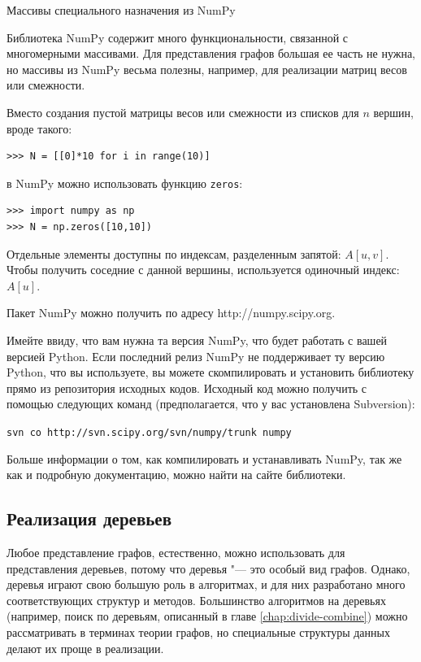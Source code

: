 \begin{notice}{Массивы специального назначения из NumPy}

Библиотека NumPy содержит много функциональности, связанной с многомерными массивами. Для представления графов большая ее часть не нужна, но массивы из NumPy весьма полезны, например, для реализации матриц весов или смежности.

Вместо создания пустой матрицы весов или смежности из списков для $n$ вершин, вроде такого:
\begin{lstlisting}
>>> N = [[0]*10 for i in range(10)]
\end{lstlisting}
в NumPy можно использовать функцию \texttt{zeros}:
\begin{lstlisting}
>>> import numpy as np
>>> N = np.zeros([10,10])
\end{lstlisting}

Отдельные элементы доступны по индексам, разделенным запятой: $A[u,v]$. Чтобы получить соседние с данной вершины, используется одиночный индекс: $A[u]$.

Пакет NumPy можно получить по адресу http://numpy.scipy.org.

Имейте ввиду, что вам нужна та версия NumPy, что будет работать с вашей версией Python. Если последний релиз NumPy не поддерживает ту версию Python, что вы используете, вы можете скомпилировать и установить библиотеку прямо из репозитория исходных кодов. Исходный код можно получить с помощью следующих команд (предполагается, что у вас установлена Subversion):

\texttt{svn co http://svn.scipy.org/svn/numpy/trunk numpy}

Больше информации о том, как компилировать и устанавливать NumPy, так же как и подробную документацию, можно найти на сайте библиотеки.

\end{notice}

\subsection{Реализация деревьев}

Любое представление графов, естественно, можно использовать для представления деревьев, потому что деревья "--- это особый вид графов. Однако, деревья играют свою большую роль в алгоритмах, и для них разработано много соответствующих структур и методов. Большинство алгоритмов на деревьях (например, поиск по деревьям, описанный в главе \ref{chap:divide-combine}) можно рассматривать в терминах теории графов, но специальные структуры данных делают их проще в реализации. 

